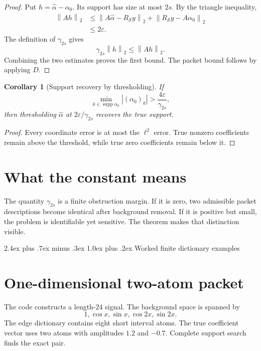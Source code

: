 \documentclass[11pt,oneside]{book}
\makeatletter
\renewcommand\chapter{\@startsection{chapter}{0}{\z@}%
  {2.4ex plus .7ex minus .3ex}%
  {1.0ex plus .2ex}%
  {\normalfont\LARGE\bfseries\color{Ink}}}
\newtheorem{corollary}[theorem]{Corollary}
\theoremstyle{remark}
\newcommand{\supp}{\operatorname{supp}}
\newcommand{\norm}[1]{\left\lVert #1\right\rVert}
\newcommand{\RS}{R_{\mathcal S}}
\makeatother
\begin{document}
\begin{proof}
Put \(h=\widehat\alpha-\alpha_0\). Its support has size at most \(2s\). By the triangle inequality,
\[
\begin{aligned}
\norm{Ah}_2
&\le
\norm{A\widehat\alpha-\RS y}_2
+
\norm{\RS y-A\alpha_0}_2\\
&\le2\varepsilon.
\end{aligned}
\]
The definition of \(\gamma_{2s}\) gives
\[
\gamma_{2s}\norm{h}_2\le\norm{Ah}_2.
\]
Combining the two estimates proves the first bound. The packet bound follows by applying \(D\).
\end{proof}

\begin{corollary}[Support recovery by thresholding]
If
\[
\min_{k\in\supp\alpha_0}|(\alpha_0)_k|
>
\frac{4\varepsilon}{\gamma_{2s}},
\]
then thresholding \(\widehat\alpha\) at \(2\varepsilon/\gamma_{2s}\) recovers the true support.
\end{corollary}

\begin{proof}
Every coordinate error is at most the \(\ell^2\) error. True nonzero coefficients remain above the threshold, while true zero coefficients remain below it.
\end{proof}

\section{What the constant means}
The quantity \(\gamma_{2s}\) is a finite obstruction margin. If it is zero, two admissible packet descriptions become identical after background removal. If it is positive but small, the problem is identifiable yet sensitive. The theorem makes that distinction visible.

\chapter{Worked finite dictionary examples}
\section{One-dimensional two-atom packet}
The code constructs a length-24 signal. The background space is spanned by
\[
1,
\cos x,
\sin x,
\cos2x,
\sin2x.
\]
The edge dictionary contains eight short interval atoms. The true coefficient vector uses two atoms with amplitudes \(1.2\) and \(-0.7\). Complete support search finds the exact pair.
\end{document}
